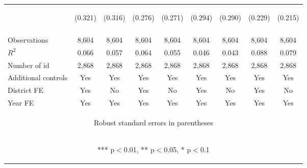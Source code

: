 \begin{center}
\begin{tabular}{lcccccccc}
 & \begin{footnotesize}(0.321)\end{footnotesize} & \begin{footnotesize}(0.316)\end{footnotesize} & \begin{footnotesize}(0.276)\end{footnotesize} & \begin{footnotesize}(0.271)\end{footnotesize} & \begin{footnotesize}(0.294)\end{footnotesize} & \begin{footnotesize}(0.290)\end{footnotesize} & \begin{footnotesize}(0.229)\end{footnotesize} & \begin{footnotesize}(0.215)\end{footnotesize} \\
\vspace{4pt} & \begin{footnotesize}\end{footnotesize} & \begin{footnotesize}\end{footnotesize} & \begin{footnotesize}\end{footnotesize} & \begin{footnotesize}\end{footnotesize} & \begin{footnotesize}\end{footnotesize} & \begin{footnotesize}\end{footnotesize} & \begin{footnotesize}\end{footnotesize} & \begin{footnotesize}\end{footnotesize} \\
Observations & 8,604 & 8,604 & 8,604 & 8,604 & 8,604 & 8,604 & 8,604 & 8,604 \\
$R^2$ & 0.066 & 0.057 & 0.064 & 0.055 & 0.046 & 0.043 & 0.088 & 0.079 \\
Number of id & 2,868 & 2,868 & 2,868 & 2,868 & 2,868 & 2,868 & 2,868 & 2,868 \\
Additional controls & Yes & Yes & Yes & Yes & Yes & Yes & Yes & Yes \\
District FE & Yes & No & Yes & No & Yes & No & Yes & No \\
 Year FE & Yes & Yes & Yes & Yes & Yes & Yes & Yes & Yes \\ \hline
\multicolumn{9}{c}{\begin{footnotesize} Robust standard errors in parentheses\end{footnotesize}} \\
\multicolumn{9}{c}{\begin{footnotesize} *** p$<$0.01, ** p$<$0.05, * p$<$0.1\end{footnotesize}} \\
\end{tabular}
\end{center}
